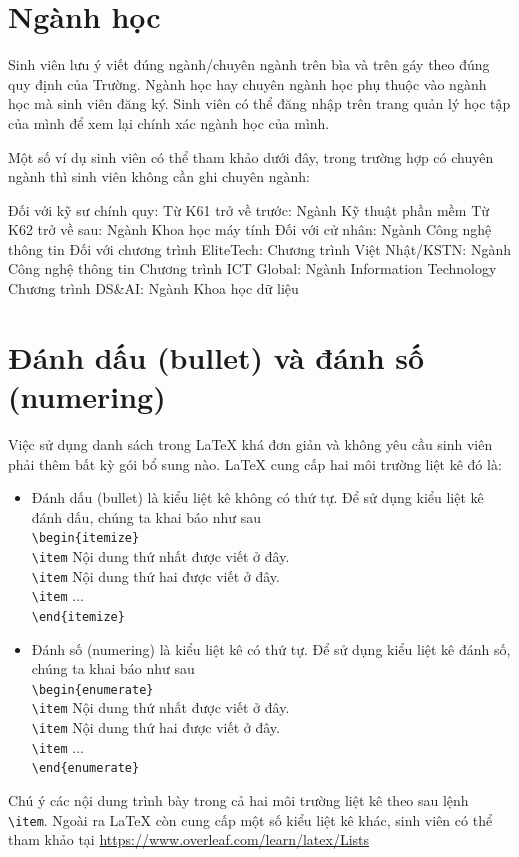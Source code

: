 \documentclass[../DoAn.tex]{subfiles}
\begin{document}
\section{Ngành học}
Sinh viên lưu ý viết đúng ngành/chuyên ngành trên bìa và trên gáy theo đúng quy định của Trường. Ngành học hay chuyên ngành học phụ thuộc vào ngành học mà sinh viên đăng ký. Sinh viên có thể đăng nhập trên trang quản lý học tập của mình để xem lại chính xác ngành học của mình. 

Một số ví dụ sinh viên có thể tham khảo dưới đây, trong trường hợp có chuyên ngành thì sinh viên không cần ghi chuyên ngành:

\begin{outline}
 \1 Đối với kỹ sư chính quy:
   \2 Từ K61 trở về trước: Ngành Kỹ thuật phần mềm
   \2 Từ K62 trở về sau: Ngành Khoa học máy tính
 \1 Đối với cử nhân:
   \2 Ngành Công nghệ thông tin
 \1 Đối với chương trình EliteTech:
   \2 Chương trình Việt Nhật/KSTN: Ngành Công nghệ thông tin
   \2 Chương trình ICT Global: Ngành Information Technology
   \2 Chương trình DS\&AI: Ngành Khoa học dữ liệu
\end{outline}

\section{Đánh dấu (bullet) và đánh số (numering)}
Việc sử dụng danh sách trong LaTeX khá đơn giản và không yêu cầu sinh viên phải thêm bất kỳ gói bổ sung nào. LaTeX cung cấp hai môi trường liệt kê đó là:
\begin{itemize}
\item Đánh dấu (bullet) là kiểu liệt kê không có thứ tự. Để sử dụng kiểu liệt kê đánh dấu, chúng ta khai báo như sau\\ 
\verb$\begin{itemize}$\\
 \verb$\item$ Nội dung thứ nhất được viết ở đây.\\
\verb$\item$ Nội dung thứ hai được viết ở đây.\\
 \verb$\item$ ...\\
\verb$\end{itemize}$
\item Đánh số (numering) là kiểu liệt kê có thứ tự. Để sử dụng kiểu liệt kê đánh số, chúng ta khai báo như sau\\
\verb$\begin{enumerate}$\\
 \verb$\item$ Nội dung thứ nhất được viết ở đây.\\
\verb$\item$ Nội dung thứ hai được viết ở đây.\\
 \verb$\item$ ...\\
\verb$\end{enumerate}$
\end{itemize}
Chú ý các nội dung trình bày trong cả hai môi trường liệt kê theo sau lệnh \verb$\item$. Ngoài ra LaTeX còn cung cấp một số kiểu liệt kê khác, sinh viên có thể tham khảo tại \url{https://www.overleaf.com/learn/latex/Lists}
\end{document}
